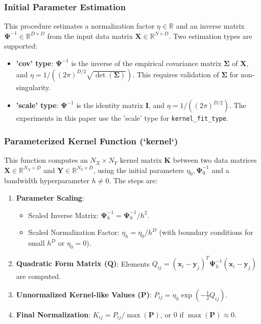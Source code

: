 \documentclass[conference]{IEEEtran} %
\newcommand{\mat}[1]{\mathbf{#1}} %
\newcommand{\vecbf}[1]{\bm{#1}} %
\begin{document}
\subsubsection{Initial Parameter Estimation}
This procedure estimates a normalization factor $\eta \in \mathbb{R}$ and an inverse matrix $\mat{\Psi}^{-1} \in \mathbb{R}^{D \times D}$ from the input data matrix $\mat{X} \in \mathbb{R}^{N \times D}$. Two estimation types are supported:
\begin{itemize}
    \item \textbf{'cov' type}: $\mat{\Psi}^{-1}$ is the inverse of the empirical covariance matrix $\mat{\Sigma}$ of $\mat{X}$, and $\eta = 1/((2\pi)^{D/2} \sqrt{\det(\mat{\Sigma})})$. This requires validation of $\mat{\Sigma}$ for non-singularity.
    \item \textbf{'scale' type}: $\mat{\Psi}^{-1}$ is the identity matrix $\mat{I}$, and $\eta = 1/((2\pi)^{D/2})$. The experiments in this paper use the 'scale' type for \texttt{kernel\_fit\_type}.
\end{itemize}

\subsubsection{Parameterized Kernel Function (`kernel`)}
This function computes an $N_X \times N_Y$ kernel matrix $\mat{K}$ between two data matrices $\mat{X} \in \mathbb{R}^{N_X \times D}$ and $\mat{Y} \in \mathbb{R}^{N_Y \times D}$, using the initial parameters $\eta_0, \mat{\Psi}^{-1}_0$ and a bandwidth hyperparameter $h \neq 0$.
The steps are:
\begin{enumerate}
    \item \textbf{Parameter Scaling}:
        \begin{itemize}
            \item Scaled Inverse Matrix: $\mat{\Psi}^{-1}_h = \mat{\Psi}^{-1}_0 / h^2$.
            \item Scaled Normalization Factor: $\eta_h = \eta_0 / h^D$ (with boundary conditions for small $h^D$ or $\eta_0=0$).
        \end{itemize}
    \item \textbf{Quadratic Form Matrix ($\mat{Q}$)}: Elements $Q_{ij} = (\vecbf{x}_i - \vecbf{y}_j)^T \mat{\Psi}^{-1}_h (\vecbf{x}_i - \vecbf{y}_j)$ are computed.
    \item \textbf{Unnormalized Kernel-like Values ($\mat{P}$)}: $P_{ij} = \eta_h \exp\left(-\frac{1}{2} Q_{ij}\right)$.
    \item \textbf{Final Normalization}: $K_{ij} = P_{ij} / \max(\mat{P})$, or $0$ if $\max(\mat{P}) \approx 0$.
\end{enumerate}
\end{document}
